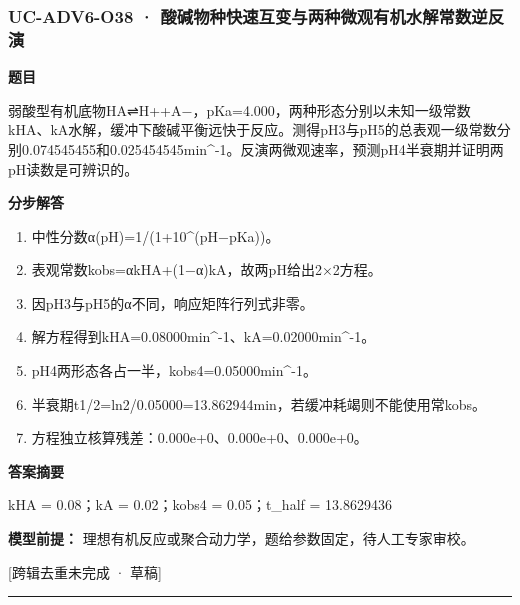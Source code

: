 \documentclass[UTF8,11pt,a4paper]{ctexart}
\begin{document}
\subsubsection*{UC-ADV6-O38 · 酸碱物种快速互变与两种微观有机水解常数逆反演}
\noindent\textbf{题目}\par
弱酸型有机底物HA⇌H++A−，pKa=4.000，两种形态分别以未知一级常数kHA、kA水解，缓冲下酸碱平衡远快于反应。测得pH3与pH5的总表观一级常数分别0.074545455和0.025454545min\textasciicircum{}-1。反演两微观速率，预测pH4半衰期并证明两pH读数是可辨识的。\par
\medskip\noindent\textbf{分步解答}
\begin{enumerate}
\item 中性分数α(pH)=1/(1+10\textasciicircum{}(pH−pKa))。
\item 表观常数kobs=αkHA+(1−α)kA，故两pH给出2×2方程。
\item 因pH3与pH5的α不同，响应矩阵行列式非零。
\item 解方程得到kHA=0.08000min\textasciicircum{}-1、kA=0.02000min\textasciicircum{}-1。
\item pH4两形态各占一半，kobs4=0.05000min\textasciicircum{}-1。
\item 半衰期t1/2=ln2/0.05000=13.862944min，若缓冲耗竭则不能使用常kobs。
\item 方程独立核算残差：0.000e+0、0.000e+0、0.000e+0。
\end{enumerate}
\noindent\textbf{答案摘要}\par
kHA = 0.08；kA = 0.02；kobs4 = 0.05；t\_half = 13.8629436\par
\noindent\textbf{模型前提：}
理想有机反应或聚合动力学，题给参数固定，待人工专家审校。\par
\noindent\textcolor{red!65!black}{[跨辑去重未完成 · 草稿]} \par
\medskip\hrule\medskip
{}
\end{document}
